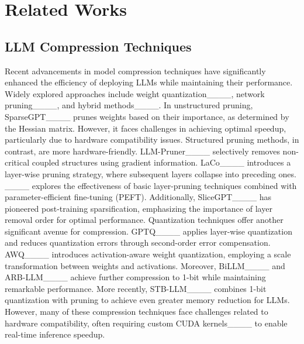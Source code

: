 \section{Related Works}
\vspace{-2mm}
	\subsection{LLM Compression Techniques}
	\vspace{-2mm}
	Recent advancements in model compression techniques have significantly enhanced the efficiency of deploying LLMs while maintaining their performance. Widely explored approaches include weight quantization____, network pruning____, and hybrid methods____.
	In unstructured pruning, SparseGPT____ prunes weights based on their importance, as determined by the Hessian matrix. However, it faces challenges in achieving optimal speedup, particularly due to hardware compatibility issues. Structured pruning methods, in contrast, are more hardware-friendly. LLM-Pruner____ selectively removes non-critical coupled structures using gradient information. LaCo____ introduces a layer-wise pruning strategy, where subsequent layers collapse into preceding ones. ____ explores the effectiveness of basic layer-pruning techniques combined with parameter-efficient fine-tuning (PEFT). Additionally, SliceGPT____ has pioneered post-training sparsification, emphasizing the importance of layer removal order for optimal performance.
	Quantization techniques offer another significant avenue for compression. GPTQ____ applies layer-wise quantization and reduces quantization errors through second-order error compensation. AWQ____ introduces activation-aware weight quantization, employing a scale transformation between weights and activations. Moreover, BiLLM____ and ARB-LLM____ achieve further compression to 1-bit while maintaining remarkable performance. More recently, STB-LLM____ combines 1-bit quantization with pruning to achieve even greater memory reduction for LLMs.
	However, many of these compression techniques face challenges related to hardware compatibility, often requiring custom CUDA kernels____ to enable real-time inference speedup.
	
	
	
	\vspace{-1.2mm}
